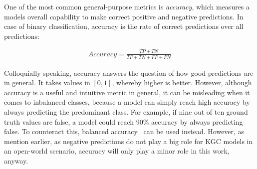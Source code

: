 One of the most common general-purpose metrics is \emph{accuracy}, which measures a models overall capability to make correct positive and negative predictions. In case of binary classification, accuracy is the rate of correct predictions over all predictions:

\begin{align}
    Accuracy = \frac{TP + TN}{TP + TN + FP + FN}
    \label{eq:2_basics/4_metrics/2_accuracy/accuracy}
\end{align}

Colloquially speaking, accuracy answers the question of how good predictions are in general. It takes values in $[0, 1]$, whereby higher is better. However, although accuracy is a useful and intuitive metric in general, it can be misleading when it comes to inbalanced classes, because a model can simply reach high accuracy by always predicting the predominant class. For example, if nine out of ten ground truth values are false, a model could reach 90\% accuracy by always predicting false. To counteract this, balanced accuracy~\cite{Mower2005PREPMtPR} can be used instead. However, as mention earlier, as negative predictions do not play a big role for KGC models in an open-world scenario, accuracy will only play a minor role in this work, anyway.
